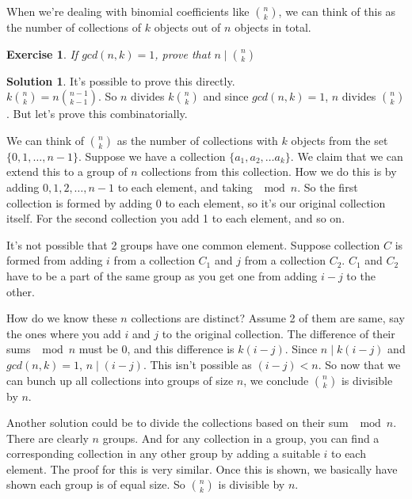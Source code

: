 \documentclass[a4paper,10pt]{article}
\newtheorem{exercise}{Exercise}[section]
\theoremstyle{definition} %
\newtheorem*{solution}{Solution}
\begin{document}
    When we're dealing with binomial coefficients like $\binom{n}{k}$, we can think of
    this as the number of collections of $k$ objects out of $n$ objects in total.

    \begin{exercise}
        If $gcd(n,k) = 1$, prove that $n \mid \binom{n}{k}$
    \end{exercise}
    \begin{solution}
        It's possible to prove this directly. \\
        $k \binom{n}{k} = n \binom{n-1}{k-1}$. So $n$ divides $k \binom{n}{k}$ and
        since $gcd(n,k)=1$, $n$ divides $\binom{n}{k}$. But let's prove this combinatorially.

        We can think of $\binom{n}{k}$ as the number of collections with $k$ objects
        from the set $\{0, 1, \dots, n-1\}$. Suppose we have a collection $\{a_1,
        a_2, \dots a_k \}$. We claim that we can extend this to a group of $n$ collections from this 
        collection. How we do this is by adding $0, 1, 2, \dots, n-1$ to each element, 
        and taking $\mod n$. So the first collection is formed by adding $0$ to each element,
        so it's our original collection itself. For the second collection you add 1 to 
        each element, and so on.

        It's not possible that 2 groups have one common element. Suppose collection $C$ is formed
        from adding $i$ from a collection $C_1$ and $j$ from a collection $C_2$. $C_1$ and $C_2$
        have to be a part of the same group as you get one from adding $i-j$ to the other.

        How do we know these $n$ collections are distinct? Assume 2 of them are same, say the ones where
        you add $i$ and $j$ to the original collection. The difference of their sums $\mod n$ must 
        be 0, and this difference is $k(i-j)$. Since $n \mid k(i-j)$ and $gcd(n,k)=1$, $n \mid (i-j)$.
        This isn't possible as $(i-j) < n$. So now that we can bunch up all collections into groups
        of size $n$, we conclude $\binom{n}{k}$ is divisible by $n$.

        Another solution could be to divide the collections based on their sum $\mod n$. There are
        clearly $n$ groups. And for any collection in a group, you can find a corresponding collection
        in any other group by adding a suitable $i$ to each element. The proof for this is very similar. Once this is 
        shown, we basically have shown each group is of equal size. So $\binom{n}{k}$ is divisible by $n$.
    \end{solution}
\end{document}
